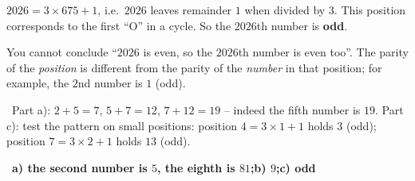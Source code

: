 \documentclass[11pt]{article}
\providecommand{\AnsWord}{Đáp số}
\newcommand{\ans}[1]{\par\smallskip{\bfseries\color{tmGreen!88!black}\AnsWord:}\ {\bfseries\color{AnsRed}#1}\par}
\newcommand{\verify}[1]{\par\smallskip\noindent{\bfseries\color{tmGreen!80!black}\faCheckCircle\ \CheckWord}\ #1\par}
\def\AnsWord{Answer}
\def\CheckWord{Check:}
\begin{document}
{$2026 = 3\times 675 + 1$, i.e.\ $2026$ leaves remainder $1$ when divided by $3$. This position corresponds to the first ``O'' in
a cycle. So the $2026$th number is \textbf{odd}.
\begin{warnbox}You cannot conclude ``$2026$ is even, so the $2026$th number is even too''. The parity of the \emph{position} is
different from the parity of the \emph{number} in that position; for example, the $2$nd number is $1$ (odd).\end{warnbox}
\verify{Part a): $2 + 5 = 7$, $5 + 7 = 12$, $7 + 12 = 19$ -- indeed the fifth number is $19$. Part c): test the pattern on small
positions: position $4 = 3\times 1 + 1$ holds $3$ (odd); position $7 = 3\times 2 + 1$ holds $13$ (odd).}
\ans{a) the second number is $5$, the eighth is $81$;\quad b) $9$;\quad c) odd}
}

\end{document}
